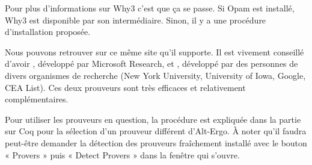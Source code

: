 Pour plus d'informations sur Why3 c'est  que 
ça se passe. Si Opam est installé, Why3 est disponible par son 
intermédiaire. Sinon, il y a une procédure d'installation proposée.



Nous pouvons retrouver sur ce même site 
 qu'il supporte.
Il est vivement conseillé d'avoir ,
développé par Microsoft Research, et ,
développé par des personnes de divers organismes de recherche (New York 
University, University of Iowa, Google, CEA List). Ces deux prouveurs sont très
efficaces et relativement complémentaires.



Pour utiliser les prouveurs en question, la procédure est expliquée dans la partie
sur Coq pour la sélection d'un prouveur différent d'Alt-Ergo. À noter qu'il faudra
peut-être demander la détection des prouveurs fraîchement installé avec le 
bouton « Provers » puis « Detect Provers » dans la fenêtre qui s'ouvre.
